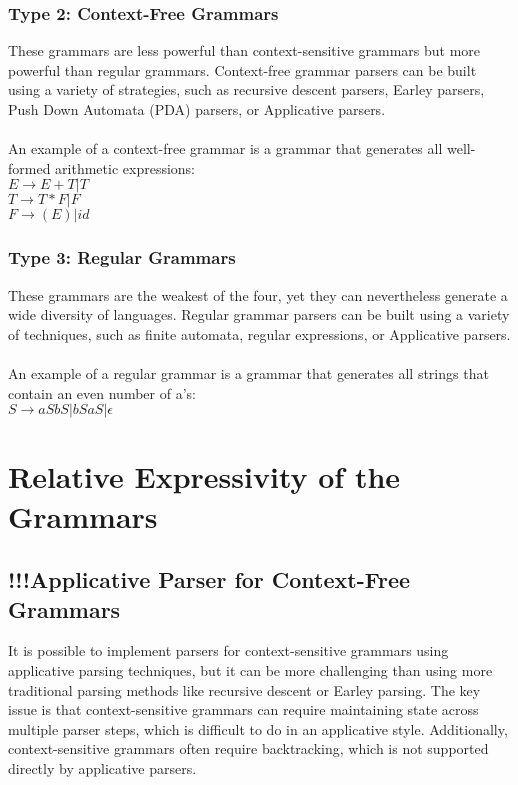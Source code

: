 \documentclass[12pt,twoside]{report}
\begin{document}
\subsection{Type 2: Context-Free Grammars}
These grammars are less powerful than context-sensitive grammars but more powerful than regular grammars. Context-free grammar parsers can be built using a variety of strategies, such as recursive descent parsers, Earley parsers, Push Down Automata (PDA) parsers, or Applicative parsers.
\\\\
An example of a context-free grammar is a grammar that generates all well-formed arithmetic expressions:\\
$E \rightarrow E + T | T$\\
$T \rightarrow T * F | F$\\
$F \rightarrow (E) | id$
\subsection{Type 3: Regular Grammars}
These grammars are the weakest of the four, yet they can nevertheless generate a wide diversity of languages. Regular grammar parsers can be built using a variety of techniques, such as finite automata, regular expressions, or Applicative parsers.
\\\\
An example of a regular grammar is a grammar that generates all strings that contain an even number of a's:\\
$S \rightarrow aSbS | bSaS | \epsilon$
\chapter{Relative Expressivity of the Grammars} 
\section{!!!Applicative Parser for Context-Free Grammars}
It is possible to implement parsers for context-sensitive grammars using applicative parsing techniques, but it can be more challenging than using more traditional parsing methods like recursive descent or Earley parsing. The key issue is that context-sensitive grammars can require maintaining state across multiple parser steps, which is difficult to do in an applicative style. Additionally, context-sensitive grammars often require backtracking, which is not supported directly by applicative parsers.
\end{document}
